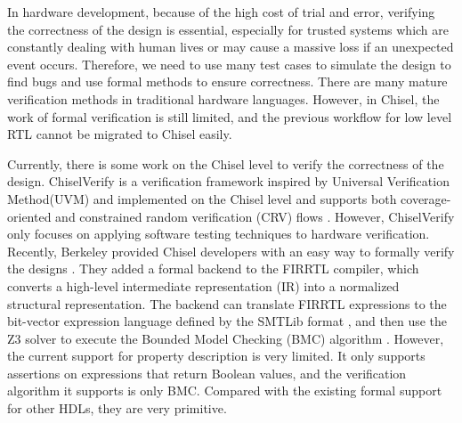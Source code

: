 \documentclass[conference]{IEEEtran}
\theoremstyle{definition}
\begin{document}
In hardware development, because of the high cost of trial and error, verifying the correctness of the design is essential, especially for trusted systems which are constantly dealing with human lives or may cause a massive loss if an unexpected event occurs. Therefore, we need to use many test cases to simulate the design to find bugs and use formal methods to ensure correctness. There are many mature verification methods in traditional hardware languages. However, in Chisel, the work of formal verification is still limited, and the previous workflow for low level RTL cannot be migrated to Chisel easily.

Currently, there is some work on the Chisel level to verify the correctness of the design. ChiselVerify is a verification framework inspired by Universal Verification Method(UVM) \cite{mehta2018uvm} and implemented on the Chisel level and supports both coverage-oriented and constrained random verification (CRV) flows \cite{dobis2021chiselverify}. However, ChiselVerify only focuses on applying software testing techniques to hardware verification.
Recently, Berkeley provided Chisel developers with an easy way to formally verify the designs \cite{dobis2021open}. They added a formal backend to the FIRRTL compiler, which converts a high-level intermediate representation (IR) into a normalized structural representation. The backend can translate FIRRTL expressions to the bit-vector expression language defined by the SMTLib format \cite{barrett2010smt}, and then use the Z3 solver \cite{moura2008z3} to execute the Bounded Model Checking (BMC) algorithm \cite{biere2009bounded}.
However, the current support for property description is very limited. It only supports assertions on expressions that return Boolean values, and the verification algorithm it supports is only BMC. Compared with the existing formal support for other HDLs, they are very primitive.
\end{document}
